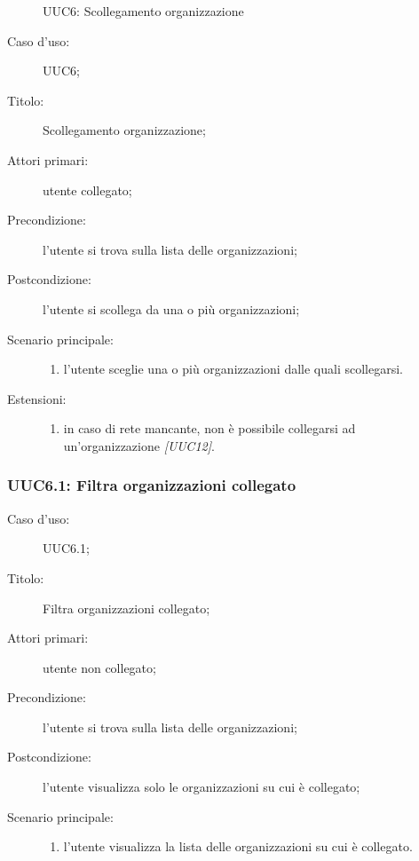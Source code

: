 \documentclass[../../../analisi-dei-requisiti.tex]{subfiles}
\begin{document}
\begin{figure}[H]
  \centering
  \caption{UUC6: Scollegamento organizzazione}%
  \label{fig:UUC12}
\end{figure}

\begin{description}
  \item[Caso d’uso:] UUC6;
  \item[Titolo:] Scollegamento organizzazione;
  \item[Attori primari:] utente collegato;
  \item[Precondizione:] l'utente si trova sulla lista delle organizzazioni;
  \item[Postcondizione:] l'utente si scollega da una o più organizzazioni;
  \item[Scenario principale:]
        \begin{enumerate}
          \item l'utente sceglie una o più organizzazioni dalle quali scollegarsi.
        \end{enumerate}
  \item[Estensioni:]
        \begin{enumerate}
          \item in caso di rete mancante, non è possibile collegarsi ad un'organizzazione \emph{[UUC12]}.
        \end{enumerate}
\end{description}


\subsubsection{UUC6.1: Filtra organizzazioni collegato}%
\begin{description}
  \item[Caso d’uso:] UUC6.1;
  \item[Titolo:] Filtra organizzazioni collegato;
  \item[Attori primari:] utente non collegato;
  \item[Precondizione:] l'utente si trova sulla lista delle organizzazioni;
  \item[Postcondizione:] l'utente visualizza solo le organizzazioni su cui è collegato;
  \item[Scenario principale:]
        \begin{enumerate}
          \item l'utente visualizza la lista delle organizzazioni su cui è collegato.
        \end{enumerate}
\end{description}
\end{document}
